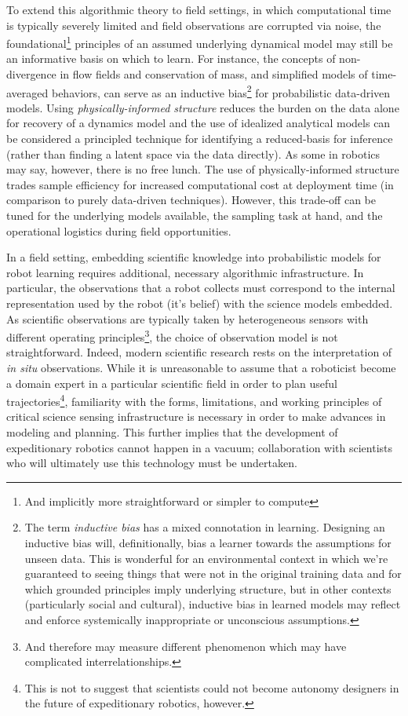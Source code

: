 To extend this algorithmic theory to field settings, in which computational time is typically severely limited and field observations are corrupted via noise, the foundational\footnote{And implicitly more straightforward or simpler to compute} principles of an assumed underlying dynamical model may still be an informative basis on which to learn.
For instance, the concepts of non-divergence in flow fields and conservation of mass, and simplified models of time-averaged behaviors, can serve as an inductive bias\footnote{The term \emph{inductive bias} has a mixed connotation in learning. Designing an inductive bias will, definitionally, bias a learner towards the assumptions for unseen data. This is wonderful for an environmental context in which we're guaranteed to seeing things that were not in the original training data and for which grounded principles imply underlying structure, but in other contexts (particularly social and cultural), inductive bias in learned models may reflect and enforce systemically inappropriate or unconscious assumptions.} for probabilistic data-driven models.
Using \emph{physically-informed structure} reduces the burden on the data alone for recovery of a dynamics model and the use of idealized analytical models can be considered a principled technique for identifying a reduced-basis for inference (rather than finding a latent space via the data directly).
As some in robotics may say, however, there is no free lunch.
The use of physically-informed structure trades sample efficiency for increased computational cost at deployment time (in comparison to purely data-driven techniques).
However, this trade-off can be tuned for the underlying models available, the sampling task at hand, and the operational logistics during field opportunities.

In a field setting, embedding scientific knowledge into probabilistic models for robot learning requires additional, necessary algorithmic infrastructure. 
In particular, the observations that a robot collects must correspond to the internal representation used by the robot (it's belief) with the science models embedded.
As scientific observations are typically taken by heterogeneous sensors with different operating principles\footnote{And therefore may measure different phenomenon which may have complicated interrelationships.}, the choice of observation model is not straightforward.
Indeed, modern scientific research rests on the interpretation of \emph{in situ} observations.
While it is unreasonable to assume that a roboticist become a domain expert in a particular scientific field in order to plan useful trajectories\footnote{This is not to suggest that scientists could not become autonomy designers in the future of expeditionary robotics, however.}, familiarity with the forms, limitations, and working principles of critical science sensing infrastructure is necessary in order to make advances in modeling and planning.
This further implies that the development of expeditionary robotics cannot happen in a vacuum; collaboration with scientists who will ultimately use this technology must be undertaken.

